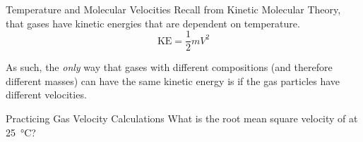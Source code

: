 \documentclass[handout]{beamer}
\begin{document}
\begin{frame}{Temperature and Molecular Velocities}
	Recall from Kinetic Molecular Theory, that gases have \alert{kinetic
	energies} that are dependent on temperature.
	\begin{equation*}
		\text{KE} = \frac{1}{2} mV^2
	\end{equation*}

	\pause

	As such, the \emph{only} way that gases with different compositions (and
	therefore different masses) can have the same kinetic energy is if the
	gas particles have different \alert{velocities}.
	\begin{center}
\end{center}
\end{frame}


\begin{frame}[t]{Practicing Gas Velocity Calculations}
	What is the root mean square velocity of  at \SI{25}{\celsius}?

\end{frame}

\end{document}
